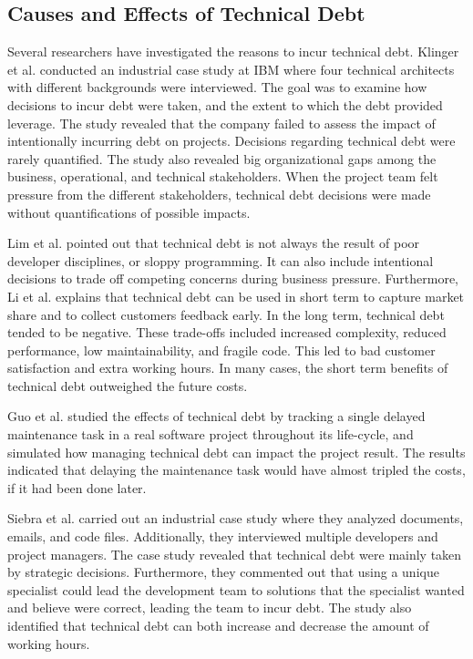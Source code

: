 \subsection{Causes and Effects of Technical Debt}
Several researchers have investigated the reasons to incur technical debt. Klinger et al.\cite{p35-klinger} conducted an industrial case study at IBM where four technical architects with different backgrounds were interviewed. The goal was to examine how decisions to incur debt were taken, and the extent to which the debt provided leverage\cite{p35-klinger}. The study revealed that the company failed to assess the impact of intentionally incurring debt on projects. Decisions regarding technical debt were rarely quantified. The study also revealed big organizational gaps among the business, operational, and technical stakeholders. When the project team felt pressure from the different stakeholders, technical debt decisions were made without quantifications of possible impacts.

Lim et al.\cite{lim-taksande} pointed out that technical debt is not always the result of poor developer disciplines, or sloppy programming. It can also include intentional decisions to trade off competing concerns during business pressure. Furthermore, Li et al. explains that technical debt can be used in short term to capture market share and to collect customers feedback early. In the long term, technical debt tended to be negative. These trade-offs included increased complexity, reduced performance, low maintainability, and fragile code. This led to bad customer satisfaction and extra working hours. In many cases, the short term benefits of technical debt outweighed the future costs.

Guo et al.\cite{guo2011tracking} studied the effects of technical debt by tracking a single delayed maintenance task in a real software project throughout its life-cycle, and simulated how managing technical debt can impact the project result. The results indicated that delaying the maintenance task would have almost tripled the costs, if it had been done later.

Siebra et al.\cite{p247-siebra} carried out an industrial case study where they analyzed documents, emails, and code files. Additionally, they interviewed multiple developers and project managers. The case study revealed that technical debt were mainly taken by strategic decisions. Furthermore, they commented out that using a unique specialist could lead the development team to solutions that the specialist wanted and believe were correct, leading the team to incur debt. The study also identified that technical debt can both increase and decrease the amount of working hours.

